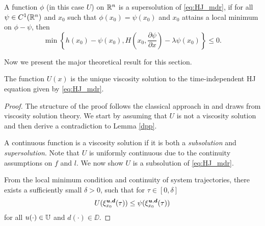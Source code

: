 \begin{for_journal}
\begin{definition} A function $\phi$ (in this case $U$) on $\mathbb{R}^n$  is a supersolution of \eqref{eq:HJ_mdr}, if for all $\psi \in C^1(\mathbb{R}^n)$ and $x_0$ such that $\phi(x_0) = \psi(x_0)$ and $x_0$ attains a local minimum on $\phi- \psi$, then 
%
\begin{equation}\label{eq:sup_sol}
    \min\left\{h(x_0)-\psi(x_0), H(x_0,\frac{\partial \psi}{\partial x}) - \lambda \psi(x_0)\right\} \leq 0.
\end{equation}
%
\end{definition}


Now we present the major theoretical result for this section.

\begin{theorem}
The function $U(x)$ is the unique viscosity solution to the time-independent HJ equation given by \eqref{eq:HJ_mdr}.

\end{theorem}

\begin{proof}
The structure of the proof follows the classical approach in \cite{Evans1984} and draws from viscosity solution theory. We start by assuming that $U$ is not a viscosity solution and then derive a contradiction to Lemma \ref{dpp}. 

A continuous function is a viscosity solution if it is both a \emph{subsolution} and \emph{supersolution}. Note that $U$ is uniformly continuous due to the continuity assumptions on $f$ and $l$. We now show $U$ is a subsolution of \eqref{eq:HJ_mdr}.

From the local minimum condition and continuity of system trajectories, there exists a sufficiently small $\delta>0$, such that for $\tau \in [0, \delta]$%
\begin{equation*}
U(\xi_{x_0}^{\bm{u}, \bm{d}}(\tau)) \leq \psi(\xi_{x_0}^{\bm{u}, \bm{d}}(\tau))
\end{equation*}
%
for all $u(\cdot) \in \mathbb{U}$ and $d(\cdot) \in \DD$.


\end{proof}
\end{for_journal}

